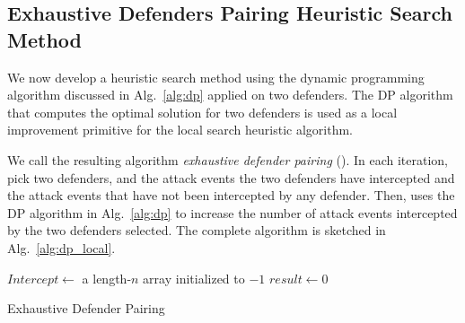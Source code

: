 
\subsection{Exhaustive Defenders Pairing Heuristic Search Method}
\label{sec:dp_local}
We now develop a heuristic search method using the dynamic programming algorithm discussed in Alg.~\ref{alg:dp} applied on two defenders.
The DP algorithm that computes the optimal solution for two defenders is used as a local improvement primitive for the local search heuristic algorithm. 

We call the resulting algorithm \emph{exhaustive defender pairing} (\ours).  
In each iteration, \ours pick two defenders, and the attack events the two defenders have intercepted and the attack events that have not been intercepted by any defender. 
Then, \ours uses the DP algorithm in Alg.~\ref{alg:dp} to increase the number of attack events intercepted by the two defenders selected. 
The complete algorithm is sketched in Alg.~\ref{alg:dp_local}.

\begin{algorithm}[h]
\DontPrintSemicolon
{}

$Intercept \gets$ a length-$n$ array initialized to $-1$\;
$result\gets 0$\;
\vspace{1mm}
\vspace{1mm}
\caption{Exhaustive Defender Pairing}
\label{alg:dp_local}
\end{algorithm}

